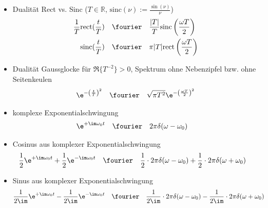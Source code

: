 \begin{itemize}
\item Dualität Rect vs. Sinc ($T\in\mathbb{R}$, $\mathrm{sinc}(\nu) := \frac{\sin(\nu)}{\nu}$)
\begin{align}
\frac{1}{T} \mathrm{rect}(\frac{t}{T}) &\quad \fourier \quad \frac{|T|}{T} \mathrm{sinc}\left(\frac{\omega T}{2}\right)\\
\mathrm{sinc}(\frac{t}{T}) &\quad \fourier \quad \pi |T| \mathrm{rect}\left(\frac{\omega T}{2}\right)
\end{align}

\item Dualität Gaussglocke für $\Re\{T^{-2}\}>0$, Spektrum ohne Nebenzipfel bzw. ohne Seitenkeulen
\begin{align}
\e^{-\left(\frac{t}{T}\right)^2} \quad \fourier \quad \sqrt{\pi T^2} \e^{-\left(\frac{\omega T}{2}\right)^2}
\end{align}


\item komplexe Exponentialschwingung
\begin{align}
\e^{+\im\omega_0 t} &\quad \fourier \quad 2\pi\delta(\omega - \omega_0)
\end{align}

\item Cosinus aus komplexer Exponentialschwingung
\begin{align}
\frac{1}{2} \e^{+\im\omega_0 t} + \frac{1}{2}  \e^{-\im\omega_0 t} &\quad \fourier \quad \frac{1}{2} \cdot 2\pi\delta(\omega -\omega_0) +\frac{1}{2} \cdot 2\pi\delta(\omega + \omega_0)
\end{align}

\item Sinus aus komplexer Exponentialschwingung
\begin{align}
\frac{1}{2\im} \e^{+\im\omega_0 t} - \frac{1}{2\im}  \e^{-\im\omega_0 t} &\quad \fourier \quad \frac{1}{2\im} \cdot 2\pi\delta(\omega -\omega_0) - \frac{1}{2\im} \cdot 2\pi\delta(\omega + \omega_0)
\end{align}
\end{itemize}





